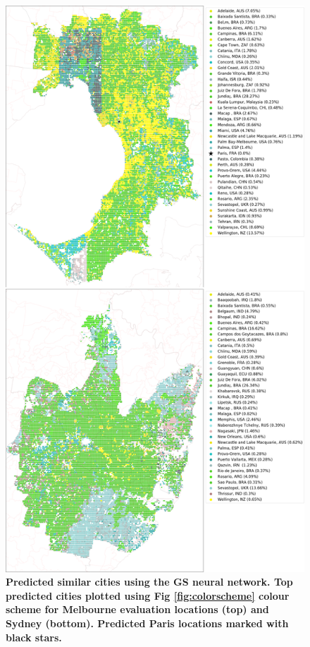 \documentclass[Crown,sageh,times]{sagej}
\begin{document}
\begin{figure}[!htbp]
\centering    
\includegraphics[scale=0.16]{Images/PlosOne/Fig8.png} 
\caption{\bf Predicted similar cities using the GS neural network. Top predicted cities plotted using Fig \ref{fig:colorscheme} colour scheme for Melbourne evaluation locations (top) and Sydney (bottom). Predicted Paris locations marked with black stars.} 
 \label{fig:melsat}  
\end{figure} 
\end{document}
